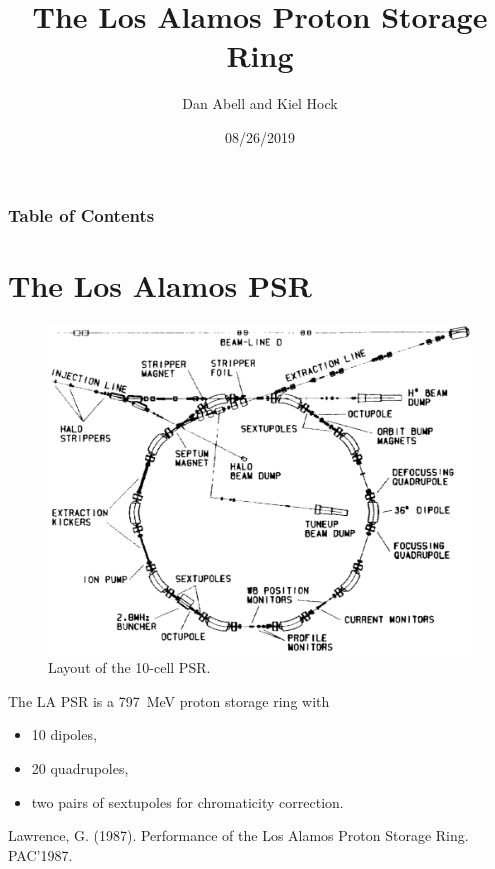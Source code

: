 \documentclass{beamer}
\begin{document}
\title[The Los Alamos Proton Storage Ring] %
{The Los Alamos Proton Storage Ring}
\author[Abell \& Hock] %
{Dan Abell and Kiel Hock} %
\date[KPT 2004]{08/26/2019} %
\frame{\titlepage}


\begin{frame}
\frametitle{Table of Contents}
\tableofcontents
\end{frame}

\section{The Los Alamos PSR}

\begin{frame}
\hspace{-4em}
\begin{minipage}{0.7\textwidth}
\begin{figure}
\includegraphics[trim={0 0 0 40}, clip, scale=0.22]{PAC1987_0825}
\caption{Layout of the 10-cell PSR.}
\end{figure}
\end{minipage}
\begin{minipage}{0.42\textwidth}
The LA PSR is a \SI{797}{MeV} proton storage ring with
\begin{itemize}
\item 10 dipoles,
\item 20 quadrupoles,
\item two pairs of sextupoles for chromaticity correction.
\end{itemize}
\end{minipage}
\footnoterule
\tiny
\cite{GPL} Lawrence, G. (1987).
           Performance of the Los Alamos Proton Storage Ring. PAC'1987.
\end{frame}
\end{document}

